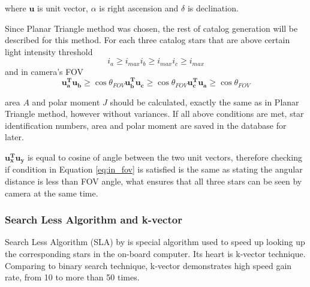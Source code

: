 \documentclass[12pt,a4paper,twoside]{article}
\begin{document}
where $\bm{u}$ is unit vector, $\alpha$ is right ascension and $\delta$ is declination.

Since Planar Triangle method was chosen, the rest of catalog generation will be described for this method. For each three catalog stars that are above certain light intensity threshold
\begin{subequations}
\begin{equation}
i_a \geq i_{max}
\end{equation}
\begin{equation}
i_b \geq i_{max}
\end{equation}
\begin{equation}
i_c \geq i_{max}
\end{equation}
\end{subequations}
and in camera's FOV
\begin{subequations}
\begin{equation}
\bm{u_a^T u_b} \geq \cos \theta_{FOV}
\end{equation}
\begin{equation}
\bm{u_b^T u_c} \geq \cos \theta_{FOV}
\end{equation}
\begin{equation}
\bm{u_c^T u_a} \geq \cos \theta_{FOV}
\end{equation}
\label{eq:in_fov}
\end{subequations}

area $A$ and polar moment $J$ should be calculated, exactly the same as in Planar Triangle method, however without variances. If all above conditions are met, star identification numbers, area and polar moment are saved in the database for later.

$\bm{u_x^T u_y}$ is equal to cosine of angle between the two unit vectors, therefore checking if condition in Equation \ref{eq:in_fov} is satisfied is the same as stating the angular distance is less than FOV angle, what ensures that all three stars can be seen by camera at the same time.

\subsubsection{Search Less Algorithm and k-vector}

Search Less Algorithm (SLA) by \citet{mortari1996fast} is special algorithm used to speed up looking up the corresponding stars in the on-board computer. Its heart is k-vector technique. Comparing to binary search technique, k-vector demonstrates high speed gain rate, from 10 to more than 50 times\cite{mortari2000k}.
\end{document}
